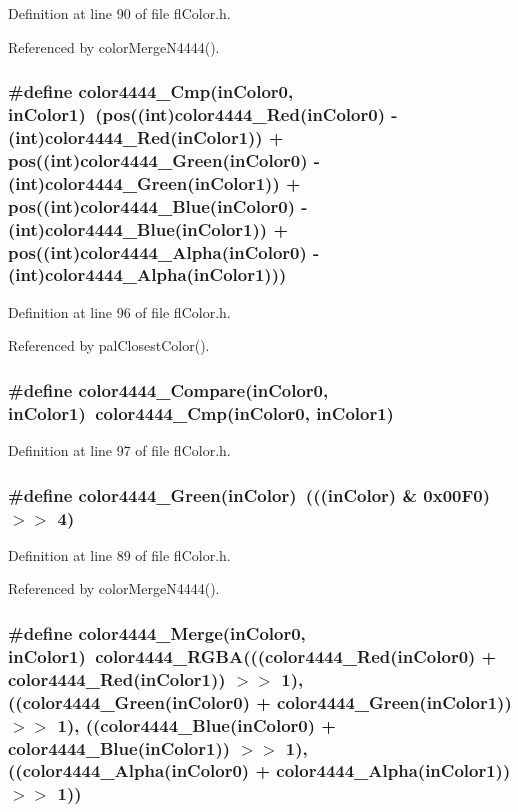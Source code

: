 Definition at line 90 of file fl\-Color.h.

Referenced by color\-Merge\-N4444().
\subsubsection{\setlength{\rightskip}{0pt plus 5cm}\#define color4444\_\-Cmp(in\-Color0, in\-Color1)~(pos((int)color4444\_\-Red(in\-Color0) - (int)color4444\_\-Red(in\-Color1)) + pos((int)color4444\_\-Green(in\-Color0) - (int)color4444\_\-Green(in\-Color1)) + pos((int)color4444\_\-Blue(in\-Color0) - (int)color4444\_\-Blue(in\-Color1)) + pos((int)color4444\_\-Alpha(in\-Color0) - (int)color4444\_\-Alpha(in\-Color1)))}\label{flColor_8h_7b66bdc2462e9f67e32a88f8985f5941}




Definition at line 96 of file fl\-Color.h.

Referenced by pal\-Closest\-Color().
\subsubsection{\setlength{\rightskip}{0pt plus 5cm}\#define color4444\_\-Compare(in\-Color0, in\-Color1)~color4444\_\-Cmp(in\-Color0, in\-Color1)}\label{flColor_8h_2fcf922ddd02c6f3a9c1f2376cfb0c43}




Definition at line 97 of file fl\-Color.h.
\subsubsection{\setlength{\rightskip}{0pt plus 5cm}\#define color4444\_\-Green(in\-Color)~(((in\-Color) \& 0x00F0) $>$$>$ 4)}\label{flColor_8h_bce497834b81242059aba40f0a5bbeff}




Definition at line 89 of file fl\-Color.h.

Referenced by color\-Merge\-N4444().
\subsubsection{\setlength{\rightskip}{0pt plus 5cm}\#define color4444\_\-Merge(in\-Color0, in\-Color1)~color4444\_\-RGBA(((color4444\_\-Red(in\-Color0) + color4444\_\-Red(in\-Color1)) $>$$>$ 1), ((color4444\_\-Green(in\-Color0) + color4444\_\-Green(in\-Color1)) $>$$>$ 1), ((color4444\_\-Blue(in\-Color0) + color4444\_\-Blue(in\-Color1)) $>$$>$ 1), ((color4444\_\-Alpha(in\-Color0) + color4444\_\-Alpha(in\-Color1)) $>$$>$ 1))}\label{flColor_8h_9a6e8c08ce8ca07bd73362e883556a54}




